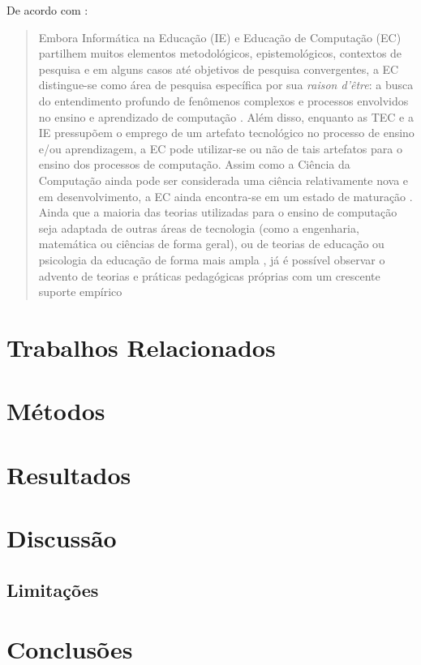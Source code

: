 \documentclass[sigconf]{educomp}
\begin{document}
De acordo com \citet{bispo2020tecnologias}: 

\begin{quote}
Embora Informática na Educação (IE) e Educação de Computação (EC) partilhem muitos elementos metodológicos, epistemológicos, contextos de pesquisa e em alguns casos até objetivos de pesquisa convergentes, a EC distingue-se como área
de pesquisa específica por sua \emph{raison d’être}: a busca do entendimento profundo de fenômenos complexos e processos envolvidos no ensino e aprendizado de computação \cite{malmi2019computing}. Além disso, enquanto as TEC e a IE pressupõem o emprego de um artefato tecnológico no processo de ensino e/ou aprendizagem, a EC pode utilizar-se ou não de tais artefatos para o ensino dos processos de computação. Assim como a Ciência da Computação ainda pode ser considerada uma ciência relativamente nova e em desenvolvimento, a EC ainda encontra-se em um estado de maturação \cite{malmi2019computing}. Ainda que a maioria das teorias utilizadas para o ensino de computação seja adaptada de outras áreas de tecnologia (como a engenharia, matemática ou ciências de forma geral), ou de teorias de educação ou psicologia da educação de forma mais ampla \cite{malmi2014theoretical}, já é possível observar o advento de teorias e práticas pedagógicas próprias \cite{malmi2019computing} com um crescente suporte empírico \cite{malmi2014theoretical}
\end{quote}

\lipsum[3-10]


\section{Trabalhos Relacionados}

\lipsum[1-5]


\section{Métodos}

\lipsum[5-10]


\section{Resultados}

\lipsum[7-14]


\section{Discussão}

\lipsum[20-27]


\subsection{Limitações}

\lipsum[27-29]


\section{Conclusões}

\lipsum[29-30]




\end{document}
